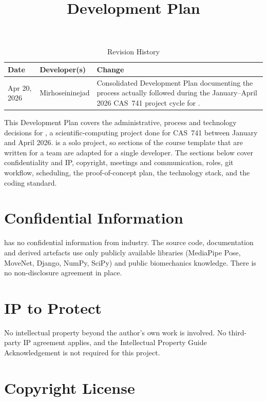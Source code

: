 \documentclass{article}
\title{Development Plan\\\progname}
\author{\authname}
\date{}
\begin{document}
\maketitle

\begin{table}[hp]
\caption{Revision History} \label{TblRevisionHistory}
\begin{tabularx}{\textwidth}{llX}
\toprule
\textbf{Date} & \textbf{Developer(s)} & \textbf{Change}\\
\midrule
Apr 20, 2026 & Mirhoseininejad & Consolidated Development Plan documenting the process actually followed during the January--April 2026 CAS~741 project cycle for \progname{}.\\
\bottomrule
\end{tabularx}
\end{table}

\newpage{}

This Development Plan covers the administrative, process and
technology decisions for \progname{}, a scientific-computing project
done for CAS~741 between January and April 2026. \progname{} is a
solo project, so sections of the course template that are written for
a team are adapted for a single developer. The sections below cover
confidentiality and IP, copyright, meetings and communication, roles,
git workflow, scheduling, the proof-of-concept plan, the technology
stack, and the coding standard.

\section{Confidential Information}

\progname{} has no confidential information from industry. The source
code, documentation and derived artefacts use only publicly available
libraries (MediaPipe Pose, MoveNet, Django, NumPy, SciPy) and public
biomechanics knowledge. There is no non-disclosure agreement in place.

\section{IP to Protect}

No intellectual property beyond the author's own work is involved. No
third-party IP agreement applies, and the Intellectual Property Guide
Acknowledgement is not required for this project.

\section{Copyright License}
\end{document}
